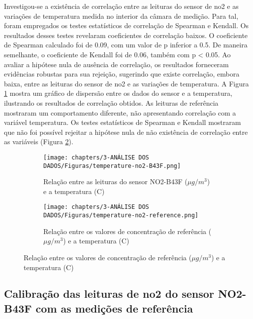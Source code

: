 Investigou-se a existência de correlação entre as leituras do sensor de \acrshort{no2} e as variações de temperatura medida no interior da câmara de medição. Para tal, foram empregados os testes estatísticos de correlação de Spearman e Kendall. Os resultados desses testes revelaram coeficientes de correlação baixos. O coeficiente de Spearman calculado foi de 0.09, com um valor de p inferior a 0.5. De maneira semelhante, o coeficiente de Kendall foi de 0.06, também com p < 0.05. Ao avaliar a hipótese nula de ausência de correlação, os resultados forneceram evidências robustas para sua rejeição, sugerindo que existe correlação, embora baixa, entre as leituras do sensor de \acrshort{no2} e as variações de temperatura. A Figura \ref{fig:data-temp-no2-corr} mostra um gráfico de dispersão entre os dados do sensor e a temperatura, ilustrando os resultados de correlação obtidos. As leituras de referência mostraram um comportamento diferente, não apresentando correlação com a variável temperatura. Os testes estatísticos de Spearman e Kendall mostraram que não foi possível rejeitar a hipótese nula de não existência de correlação entre as variáveis (Figura \ref{fig:data-temp-no2-ref-corr}).

\begin{figure}[h]
    \centering
    \caption{Relação dos dados de concentração de \acrshort{no2} com a temperatura}
    \begin{subfigure}{0.4\textwidth}
        \texttt{[image: chapters/3-ANÁLISE DOS DADOS/Figuras/temperature-no2-B43F.png]}
        \caption{Relação entre as leituras do sensor NO2-B43F (\(\mu g/m^3\)) e a temperatura (\textdegree C)}
        \label{fig:data-temp-no2-corr}
    \end{subfigure}
    \hfill
    \begin{subfigure}{0.4\textwidth}
        \texttt{[image: chapters/3-ANÁLISE DOS DADOS/Figuras/temperature-no2-reference.png]}
        \caption{Relação entre os valores de concentração de referência (\(\mu g/m^3\)) e a temperatura (\textdegree C)}
        \label{fig:data-temp-no2-ref-corr}
    \end{subfigure}
    \hfill
    \label{fig:data-no2-temp}
\end{figure}

\subsection{Calibração das leituras de \acrshort{no2} do sensor NO2-B43F com as medições de referência}

